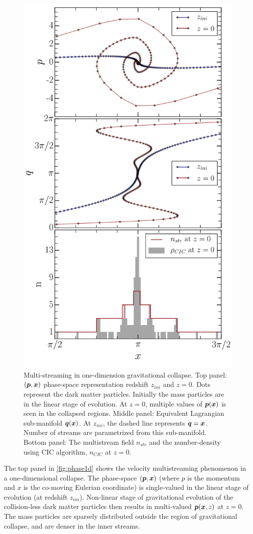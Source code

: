 \documentclass[fleqn,usenatbib,useAMS]{mnras}
\begin{document}
\begin{figure}
\begin{minipage}[t]{.99\linewidth}
  \centering\includegraphics[width=8.cm]{fig13.pdf} 
\end{minipage}\hfill
\caption{ Multi-streaming in one-dimension gravitational collapse. Top panel: $(\bmath{p}, \bmath{x})$ phase-space representation redshift $z_{ini}$ and $z = 0$. Dots represent the dark matter particles. Initially the mass particles are in the linear stage of evolution. At $z = 0$, multiple values of $\bmath{p}(\bmath{x})$ is seen in the collapsed regions. Middle panel: Equivalent Lagrangian sub-manifold $\bmath{q}(\bmath{x})$. At $z_{ini}$, the dashed line represents $\bmath{q} = \bmath{x}$. Number of streams are parametrized from this sub-manifold. Bottom panel: The multistream field $n_{str}$ and the number-density using CIC algorithm, $n_{CIC}$ at $z = 0$. }
\label{fig:phase1d}
\end{figure}

The top panel in \autoref{fig:phase1d} shows the velocity multistreaming phenomenon in a one-dimensional collapse. The phase-space $(\bmath{p}, \bmath{x})$ (where $p$ is the momentum and $x$ is the co-moving Eulerian coordinate) is single-valued in the linear stage of evolution (at redshift $z_{ini}$). Non-linear stage of gravitational evolution of the collision-less dark matter particles then results in multi-valued $\bmath{p} (\bmath{x},z)$ at $z = 0$. The mass particles are sparsely  distributed outside the region of gravitational collapse, and are denser in the inner streams.
\end{document}
